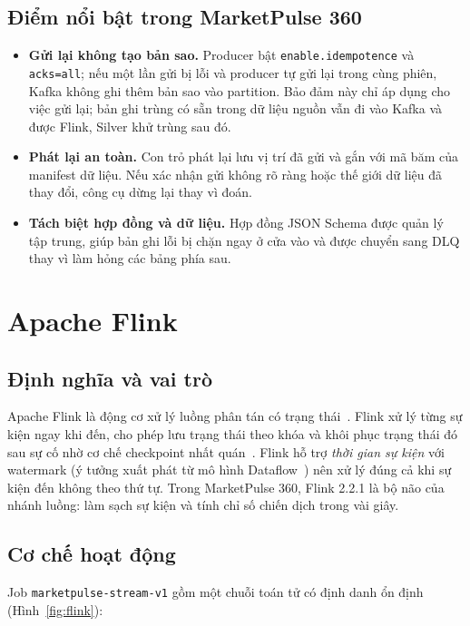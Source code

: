 \subsection{Điểm nổi bật trong MarketPulse 360}
\label{sec:c3-kafka-hien-thuc}
\begin{itemize}
    \item \textbf{Gửi lại không tạo bản sao.} Producer bật \texttt{enable.idempotence} và \texttt{acks=all}; nếu một lần gửi bị lỗi và producer tự gửi lại trong cùng phiên, Kafka không ghi thêm bản sao vào partition. Bảo đảm này chỉ áp dụng cho việc gửi lại; bản ghi trùng có sẵn trong dữ liệu nguồn vẫn đi vào Kafka và được Flink, Silver khử trùng sau đó.
    \item \textbf{Phát lại an toàn.} Con trỏ phát lại lưu vị trí đã gửi và gắn với mã băm của manifest dữ liệu. Nếu xác nhận gửi không rõ ràng hoặc thế giới dữ liệu đã thay đổi, công cụ dừng lại thay vì đoán.
    \item \textbf{Tách biệt hợp đồng và dữ liệu.} Hợp đồng JSON Schema được quản lý tập trung, giúp bản ghi lỗi bị chặn ngay ở cửa vào và được chuyển sang DLQ thay vì làm hỏng các bảng phía sau.
\end{itemize}

\section{Apache Flink}
\label{sec:c3-flink}

\subsection{Định nghĩa và vai trò}
\label{sec:c3-flink-dinh-nghia}
Apache Flink là động cơ xử lý luồng phân tán có trạng thái~\cite{carbone2015flink, flinkdocs}. Flink xử lý từng sự kiện ngay khi đến, cho phép lưu trạng thái theo khóa và khôi phục trạng thái đó sau sự cố nhờ cơ chế checkpoint nhất quán~\cite{carbone2017state}. Flink hỗ trợ \emph{thời gian sự kiện} với watermark (ý tưởng xuất phát từ mô hình Dataflow~\cite{akidau2015dataflow}) nên xử lý đúng cả khi sự kiện đến không theo thứ tự. Trong MarketPulse 360, Flink 2.2.1 là bộ não của nhánh luồng: làm sạch sự kiện và tính chỉ số chiến dịch trong vài giây.

\subsection{Cơ chế hoạt động}
\label{sec:c3-flink-co-che}
Job \texttt{marketpulse-stream-v1} gồm một chuỗi toán tử có định danh ổn định (Hình~\ref{fig:flink}):

